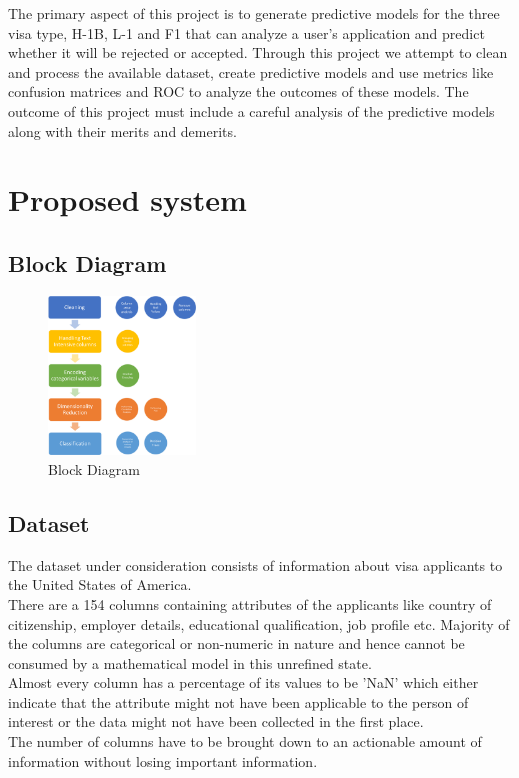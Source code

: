 \documentclass[conference]{IEEEtran}
\begin{document}
The primary aspect of this project is to generate predictive models for the three visa type, H-1B, L-1 and F1 that can analyze a user's application and predict whether it will be rejected or accepted. Through this project we attempt to clean and process the available dataset, create predictive models and use metrics like confusion matrices and ROC to analyze the outcomes of these models. The outcome of this project must include a careful analysis of the predictive models along with their merits and demerits.
\section{ Proposed system}


\subsection{\textbf{Block Diagram}}
\begin{center}
\begin{figure}[h]
\centering
\includegraphics[width=0.35\textwidth]{blockdiagram.png}
\caption{Block Diagram}
\label{fig:mesh1}
\end{figure}
\end{center}


\subsection{\textbf{Dataset}}
The dataset under consideration consists of information about visa applicants to the United States of America.\cite{dataset} \\
There are a 154 columns containing attributes of the applicants like country of citizenship, employer details, educational qualification, job profile etc. Majority of the columns are categorical or non-numeric in nature and hence cannot be consumed by a mathematical model in this unrefined state.\\  
Almost every column has a percentage of its values to be 'NaN' which either indicate that the attribute might not have been applicable to the person of interest or the data might not have been collected in the first place.\\
The number of columns have to be brought down to an actionable amount of information without losing important information.
\\
\end{document}
